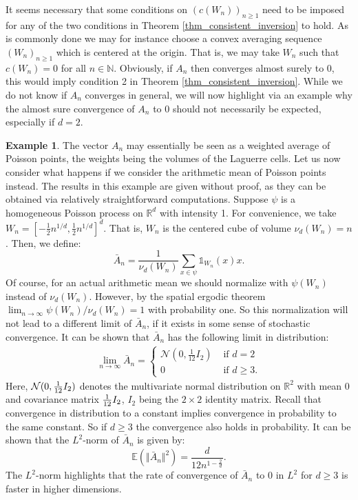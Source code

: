 \documentclass{article}
\newcommand{\NN}{\mathbb{N}}
\newcommand{\RR}{\mathbb{R}}
\newcommand{\EE}{\mathbb{E}}
\theoremstyle{plain}
\theoremstyle{remark}
\theoremstyle{definition}
\newtheorem{example}{Example}
\begin{document}
It seems necessary that some conditions on $(c(W_n))_{n\geq 1}$ need to be imposed for any of the two conditions in Theorem \ref{thm_consistent_inversion} to hold. As is commonly done we may for instance choose a convex averaging sequence $(W_n)_{n\geq 1}$ which is centered at the origin. That is, we may take $W_n$ such that $c(W_n)=0$ for all $n \in \NN$. Obviously, if $A_n$ then converges almost surely to 0, this would imply condition 2 in Theorem \ref{thm_consistent_inversion}. While we do not know if $A_n$ converges in general, we will now highlight via an example why the almost sure convergence of $A_n$ to 0 should not necessarily be expected, especially if $d=2$. 

\begin{example}\label{example_mean_poisson_points}
    The vector $A_n$ may essentially be seen as a weighted average of Poisson points, the weights being the volumes of the Laguerre cells. Let us now consider what happens if we consider the arithmetic mean of Poisson points instead. The results in this example are given without proof, as they can be obtained via relatively straightforward computations. Suppose $\psi$ is a homogeneous Poisson process on $\RR^d$ with intensity 1. For convenience, we take $W_n = [-\frac{1}{2}n^{1/d},\frac{1}{2}n^{1/d}]^d$. That is, $W_n$ is the centered cube of volume $\nu_d(W_n)=n$. Then, we define:
\[\bar{A}_n = \frac{1}{\nu_d(W_n)}\sum_{x \in \psi}\mathds{1}_{W_n}(x)x.\]
Of course, for an actual arithmetic mean we should normalize with $\psi(W_n)$ instead of $\nu_d(W_n)$. However, by the spatial ergodic theorem $\lim_{n\to\infty}\psi(W_n)/\nu_d(W_n)=1$ with probability one. So this normalization will not lead to a different limit of $\bar{A}_n$, if it exists in some sense of stochastic convergence. It can be shown that $\bar{A}_n$ has the following limit in distribution:
\begin{align*}
    \lim_{n \to \infty} \bar{A}_n = \begin{cases}
        \mathcal{N}\left(0,\frac{1}{12}I_2\right) & \text{ if } d=2\\
        0 & \text{ if } d \geq3.
    \end{cases}
\end{align*}
Here, $\mathcal{N}(0,\smash{\frac{1}{12}}I_2)$ denotes the multivariate normal distribution on $\RR^2$ with mean $0$ and covariance matrix $\smash{\frac{1}{12}}I_2$, $I_2$ being the $2\times 2$ identity matrix. Recall that convergence in distribution to a constant implies convergence in probability to the same constant. So if $d \geq 3$ the convergence also holds in probability. It can be shown that the $L^2$-norm of $\bar{A}_n$ is given by:
\[\EE\left(\Vert\bar{A}_n \Vert^2 \right) =\frac{d}{12n^{1 - \frac{2}{d}}}.\]
The $L^2$-norm highlights that the rate of convergence of $\bar{A}_n$ to $0$ in $L^2$ for $d \geq 3$ is faster in higher dimensions.
\end{example}
\end{document}
